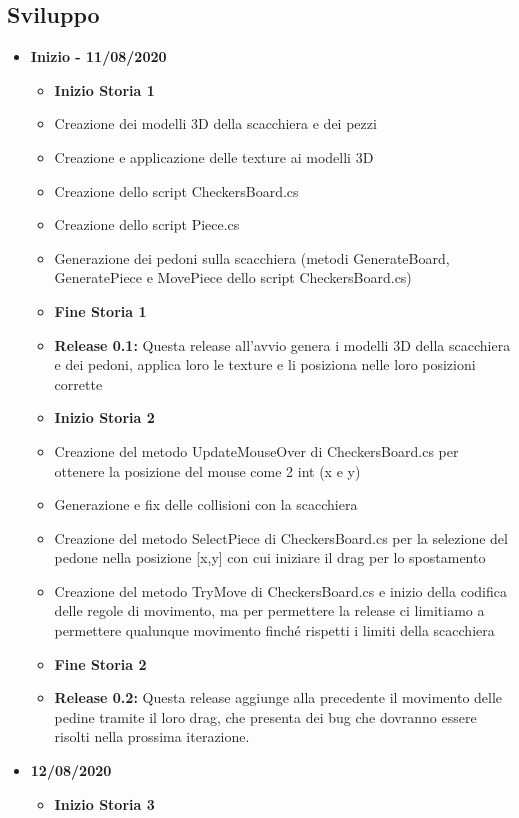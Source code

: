 \documentclass[12pt]{article}
\begin{document}
\subsection{Sviluppo}
\begin{itemize}
\item \textbf{Inizio - 11/08/2020}
	\begin{itemize}
	\item \textbf{Inizio Storia 1}
	\item Creazione dei modelli 3D della scacchiera e dei pezzi
	\item Creazione e applicazione delle texture ai modelli 3D
	\item Creazione dello script CheckersBoard.cs
	\item Creazione dello script Piece.cs
	\item Generazione dei pedoni sulla scacchiera (metodi GenerateBoard, GeneratePiece e MovePiece dello script CheckersBoard.cs)
	\item \textbf{Fine Storia 1}
	\item \textbf{Release 0.1:} Questa release all'avvio genera i modelli 3D della scacchiera e dei pedoni, applica loro le texture e li posiziona nelle loro posizioni corrette
	\item \textbf{Inizio Storia 2}
	\item Creazione del metodo UpdateMouseOver di CheckersBoard.cs per ottenere la posizione del mouse come 2 int (x e y)
	\item Generazione e fix delle collisioni con la scacchiera
	\item Creazione del metodo SelectPiece di CheckersBoard.cs per la selezione del pedone nella posizione [x,y] con cui iniziare il drag per lo spostamento
	\item Creazione del metodo TryMove di CheckersBoard.cs e inizio della codifica delle regole di movimento, ma per permettere la release ci limitiamo a permettere qualunque movimento finché rispetti i limiti della scacchiera
	\item \textbf{Fine Storia 2}
	\item \textbf{Release 0.2:} Questa release aggiunge alla precedente il movimento delle pedine tramite il loro drag, che presenta dei bug che dovranno essere risolti nella prossima iterazione.
	\end{itemize}
\item \textbf{12/08/2020}
	\begin{itemize}
	\item \textbf{Inizio Storia 3}

\end{itemize}
\end{itemize}
\end{document}
